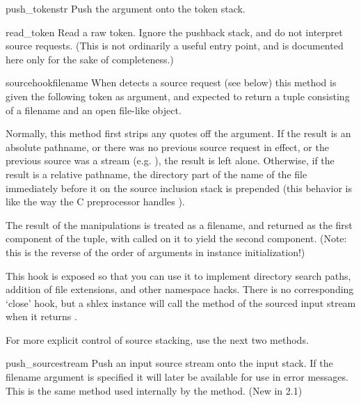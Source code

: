 \begin{methoddesc}{push_token}{str}
Push the argument onto the token stack.
\end{methoddesc}

\begin{methoddesc}{read_token}{}
Read a raw token.  Ignore the pushback stack, and do not interpret source
requests.  (This is not ordinarily a useful entry point, and is
documented here only for the sake of completeness.)
\end{methoddesc}

\begin{methoddesc}{sourcehook}{filename}
When  detects a source request (see
 below) this method is given the following token as
argument, and expected to return a tuple consisting of a filename and
an open file-like object.

Normally, this method first strips any quotes off the argument.  If
the result is an absolute pathname, or there was no previous source
request in effect, or the previous source was a stream
(e.g. ), the result is left alone.  Otherwise, if the
result is a relative pathname, the directory part of the name of the
file immediately before it on the source inclusion stack is prepended
(this behavior is like the way the C preprocessor handles
).

The result of the manipulations is treated as a filename, and returned
as the first component of the tuple, with
 called on it to yield the second component. (Note:
this is the reverse of the order of arguments in instance initialization!)

This hook is exposed so that you can use it to implement directory
search paths, addition of file extensions, and other namespace hacks.
There is no corresponding `close' hook, but a shlex instance will call
the  method of the sourced input stream when it
returns \EOF.

For more explicit control of source stacking, use the next two
methods. 
\end{methoddesc}

\begin{methoddesc}{push_source}{stream}
Push an input source stream onto the input stack.  If the filename
argument is specified it will later be available for use in error
messages.  This is the same method used internally by the
 method. (New in 2.1)
\end{methoddesc}


